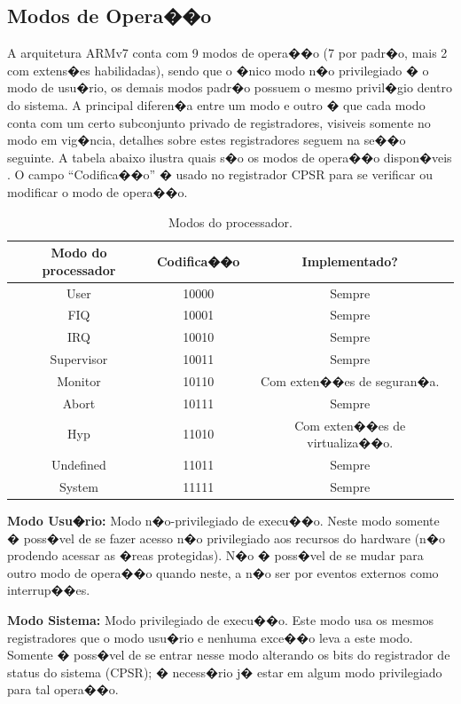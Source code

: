 \documentclass{ufscThesis/ufscThesis} %
\begin{document}
\subsection{Modos de Opera��o}
\label{sec:operating_modes}
A arquitetura ARMv7 conta com 9 modos de opera��o (7 por padr�o, mais 2 com extens�es habilidadas), sendo que o �nico modo n�o privilegiado � o modo de usu�rio, os demais modos padr�o possuem o mesmo privil�gio dentro do sistema. A principal diferen�a entre um modo e outro � que cada modo conta com um certo subconjunto privado de registradores, visiveis somente no modo em vig�ncia, detalhes sobre estes registradores seguem na se��o seguinte. A tabela abaixo ilustra quais s�o os modos de opera��o dispon�veis \cite[p.~1139]{armarm}.
O campo ``Codifica��o'' � usado no registrador CPSR para se verificar ou modificar o modo de opera��o.

\begin{table}[ht]
\centering
\begin{tabular}{ccc}
\hline\hline                        %
Modo do processador  & Codifica��o & Implementado?\\ [0.5ex] %
\hline                  %
User & 10000 & Sempre \\
FIQ & 10001 & Sempre \\
IRQ & 10010 & Sempre \\
Supervisor & 10011 & Sempre\\
Monitor & 10110 & Com exten��es de seguran�a.\\
Abort & 10111 & Sempre\\
Hyp & 11010 & Com exten��es de virtualiza��o.\\
Undefined & 11011 & Sempre\\
System & 11111 & Sempre\\[1ex]
\hline %
\end{tabular}
\caption{Modos do processador.}
\label{tab.processormode} %
\end{table}

\textbf{Modo Usu�rio:} Modo n�o-privilegiado de execu��o. Neste modo somente � poss�vel de se fazer acesso n�o privilegiado aos recursos do hardware (n�o prodendo acessar as �reas protegidas). N�o � poss�vel de se mudar para outro modo de opera��o quando neste, a n�o ser por eventos externos como interrup��es.

\textbf{Modo Sistema:} Modo privilegiado de execu��o. Este modo usa os mesmos registradores que o modo usu�rio e nenhuma exce��o leva a este modo. Somente � poss�vel de se entrar nesse modo alterando os bits do registrador de status do sistema (CPSR); � necess�rio j� estar em algum modo privilegiado para tal opera��o.
\end{document}
